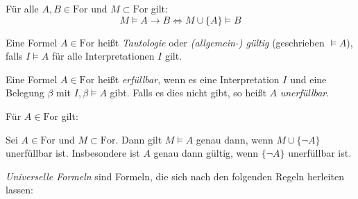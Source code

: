 \documentclass{cheat-sheet}
\newcommand{\Ibm}{I, \beta \models}
\newcommand{\For}{\mathrm{For}} %
\begin{document}
\begin{satz}
  Für alle $A, B \in \For$ und $M \subset \For$ gilt:
  \[ M \models A \to B \iff M \cup \{A\} \models B \]
\end{satz}

\begin{defn}
  Eine Formel $A \in \For$ heißt \emph{Tautologie} oder \emph{(allgemein-) gültig} (geschrieben $\models A$), falls $I \models A$ für alle Interpretationen $I$ gilt.
\end{defn}

\begin{defn}
  Eine Formel $A \in \For$ heißt \emph{erfüllbar}, wenn es eine Interpretation $I$ und eine Belegung $\beta$ mit $\Ibm A$ gibt. Falls es dies nicht gibt, so heißt $A$ \emph{unerfüllbar}.
\end{defn}

\begin{satz}
  Für $A \in \For$ gilt:
  \begin{itemize}
  \end{itemize}
\end{satz}

\begin{satz}
  Sei $A \in \For$ und $M \subset \For$. Dann gilt $M \models A$ genau dann, wenn $M \cup \{ \neg A \}$ unerfüllbar ist. Insbesondere ist $A$ genau dann gültig, wenn $\{ \neg A \}$ unerfüllbar ist.
\end{satz}



\begin{defn}
  \emph{Universelle Formeln} sind Formeln, die sich nach den folgenden Regeln herleiten lassen:

  \begin{minipage}{0.32\linewidth}
    \begin{prooftree}
    \end{prooftree}
  \end{minipage}
  \begin{minipage}{0.21\linewidth}
    \begin{prooftree}
    \end{prooftree}
  \end{minipage}
  \begin{minipage}{0.21\linewidth}
    \begin{prooftree}
    \end{prooftree}
  \end{minipage}
  \begin{minipage}{0.21\linewidth}
    \begin{prooftree}
    \end{prooftree}
  \end{minipage}
\end{defn}
\end{document}
